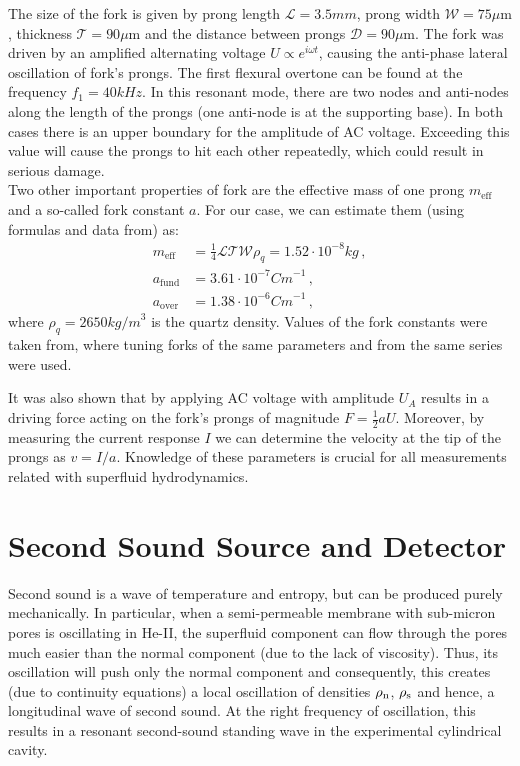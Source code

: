 The size of the fork is given by prong length $ \mathcal{L} = 3.5\unit{mm} $, prong width $ \mathcal{W}=75 \mu\text{m} $, thickness $ \mathcal{T}=90\mu\text{m} $ and the distance between prongs $ \mathcal{D}=90\mu\text{m} $. The fork was driven by an amplified alternating voltage $ U\propto e^{i\omega t} $, causing the anti-phase lateral oscillation of fork's prongs. The first flexural overtone can be found at the frequency $ f_1 = 40\unit{kHz} $. In this resonant mode, there are two nodes and anti-nodes along the length of the prongs (one anti-node is at the supporting base). In both cases there is an upper boundary for the amplitude of AC voltage. Exceeding this value will cause the prongs to hit each other repeatedly, which could result in serious damage.
\\
Two other important properties of fork are the effective mass of one prong $ m_{\text{eff}} $ and a so-called fork constant $ a $. For our case, we can estimate them (using formulas and data from\cite{forks, acoustic}) as:
\begin{align}
m_{\text{eff}}&=\frac{1}{4}\mathcal{L}\mathcal{T}\mathcal{W}\rho_q = 1.52 \cdot 10^{-8} \unit{kg}\,,\nonumber\\
a_{\text{fund}}&= 3.61 \cdot 10^{-7} \unit{Cm}^{-1}\,,\nonumber\\
a_{\text{over}}&= 1.38 \cdot 10^{-6} \unit{Cm}^{-1}\,,\nonumber
\end{align}
where $ \rho_q = 2650 \unit{kg/m}^3 $ is the quartz density. Values of the fork constants were taken from\cite{acoustic}, where tuning forks of the same parameters and from the same series were used.

It was also shown\cite{forks} that by applying AC voltage with amplitude $ U_{A} $ results in a driving force acting on the fork's prongs of magnitude $ F = \frac{1}{2}aU $. Moreover, by measuring the current response $ I $ we can determine the velocity at the tip of the prongs as $ v=I/a $. Knowledge of these parameters is crucial for all measurements related with superfluid hydrodynamics.

\section{Second Sound Source and Detector}

Second sound is a wave of temperature and entropy, but can be produced purely mechanically. In particular, when a semi-permeable membrane with sub-micron pores is oscillating in He-II, the superfluid component can flow through the pores much easier than the normal component (due to the lack of viscosity). Thus, its oscillation will push only the normal component and consequently, this creates (due to continuity equations) a local oscillation of densities $ \rho_{\mathrm{n}} $, $ \rho_{\mathrm{s}} $ and hence, a longitudinal wave of second sound. At the right frequency of oscillation, this results in a resonant second-sound standing wave in the experimental cylindrical cavity.

